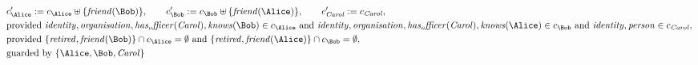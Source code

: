 \begin{align*}
&
c'_
{
\Alice
}
 := 
c_
{
\Alice
}
 \uplus 
\{
\mathit{
friend
}
(
\Bob
)
\}
, \qquad 
c'_
{
\Bob
}
 := 
c_
{
\Bob
}
 \uplus 
\{
\mathit{
friend
}
(
\Alice
)
\}
, \qquad 
c'_
{
\mathit{Carol}
}
 := 
c_
{
\mathit{Carol}
}
,\\
&
\text{provided } 
\mathit{
identity
}
,
\mathit{
organisation
}
,
\mathit{
has_officer
}
(
\mathit{Carol}
)
,
\mathit{
knows
}
(
\Bob
)
 \in c_
{
\Alice
}
 \text{ and } 
\mathit{
identity
}
,
\mathit{
organisation
}
,
\mathit{
has_officer
}
(
\mathit{Carol}
)
,
\mathit{
knows
}
(
\Alice
)
 \in c_
{
\Bob
}
 \text{ and } 
\mathit{
identity
}
,
\mathit{
person
}
 \in c_
{
\mathit{Carol}
}
,\\
&
\text{provided } 
\{
\mathit{
retired
}
,
\mathit{
friend
}
(
\Bob
)
\}
 \cap c_
{
\Alice
}
 = \emptyset
 \text{ and } 
\{
\mathit{
retired
}
,
\mathit{
friend
}
(
\Alice
)
\}
 \cap c_
{
\Bob
}
 = \emptyset
,\\
&
\text{guarded by } \{
\Alice
,
\Bob
,
\mathit{Carol}
\}
\end{align*}

